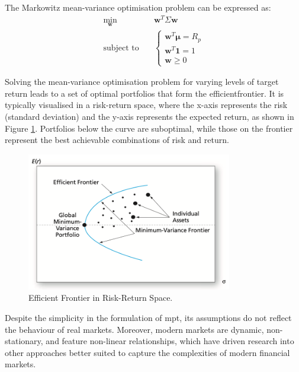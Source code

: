 The Markowitz mean-variance optimisation problem can be expressed as:
\begin{equation}
\begin{aligned}
    \min_{\mathbf{w}} \quad & \mathbf{w}^T \Sigma \mathbf{w} \\
    \text{subject to} \quad &
    \begin{cases}
        \mathbf{w}^T \boldsymbol{\mu} = R_p \\
        \mathbf{w}^T \mathbf{1} = 1 \\
        \mathbf{w} \geq 0
    \end{cases}
\end{aligned}
\end{equation}

Solving the mean-variance optimisation problem for varying levels of target return leads to a set of optimal portfolios that form the \gls{efficientfrontier}. It is typically visualised in a risk-return space, where the x-axis represents the risk (standard deviation) and the y-axis represents the expected return, as shown in Figure \ref{fig:efficient_frontier}. Portfolios below the curve are suboptimal, while those on the frontier represent the best achievable combinations of risk and return.

\begin{figure}[ht]
    \centering
    \includegraphics[width=0.8\textwidth]{figures/markowitz-efficient-frontier.png}
    \caption{Efficient Frontier in Risk-Return Space. \cite{Bodie2014}}
    \label{fig:efficient_frontier}
\end{figure}

Despite the simplicity in the formulation of \acrshort{mpt}, its assumptions do not reflect the behaviour of real markets. Moreover, modern markets are dynamic, non-stationary, and feature non-linear relationships, which have driven research into other approaches better suited to capture the complexities of modern financial markets. 
 
